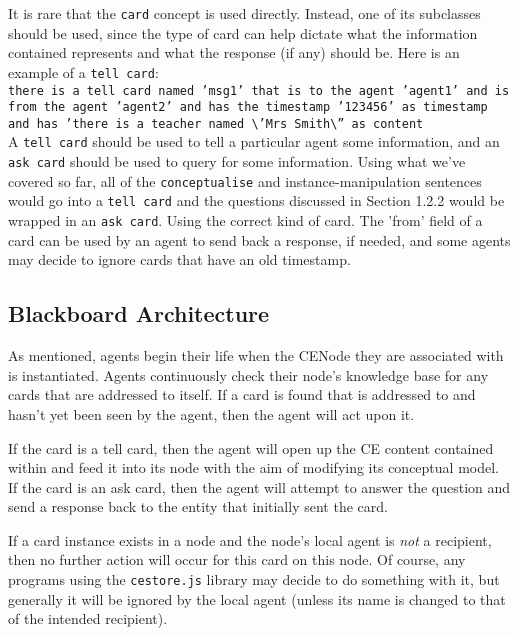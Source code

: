 \documentclass{scrartcl}
\begin{document}
It is rare that the \texttt{card} concept is used directly. Instead, one of its subclasses should be used, since the type of card can help dictate what the information contained represents and what the response (if any) should be. Here is an example of a \texttt{tell card}:\\
\texttt{there is a tell card named 'msg1' that is to the agent 'agent1' and is from the agent 'agent2' and has the timestamp '123456' as timestamp and has 'there is a teacher named \textbackslash'Mrs Smith\textbackslash'' as content}\\

A \texttt{tell card} should be used to tell a particular agent some information, and an \texttt{ask card} should be used to query for some information. Using what we've covered so far, all of the \texttt{conceptualise} and instance-manipulation sentences would go into a \texttt{tell card} and the questions discussed in Section 1.2.2 would be wrapped in an \texttt{ask card}. Using the correct kind of card. The 'from' field of a card can be used by an agent to send back a response, if needed, and some agents may decide to ignore cards that have an old timestamp. 


\subsection{Blackboard Architecture}
\label{blackboard_architecture}

As mentioned, agents begin their life when the CENode they are associated with is instantiated. Agents continuously check their node's knowledge base for any cards that are addressed to itself. If a card is found that is addressed to and hasn't yet been seen by the agent, then the agent will act upon it.

If the card is a tell card, then the agent will open up the CE content contained within and feed it into its node with the aim of modifying its conceptual model. If the card is an ask card, then the agent will attempt to answer the question and send a response back to the entity that initially sent the card.

If a card instance exists in a node and the node's local agent is \textit{not} a recipient, then no further action will occur for this card on this node. Of course, any programs using the \texttt{cestore.js} library may decide to do something with it, but generally it will be ignored by the local agent (unless its name is changed to that of the intended recipient).
\end{document}
